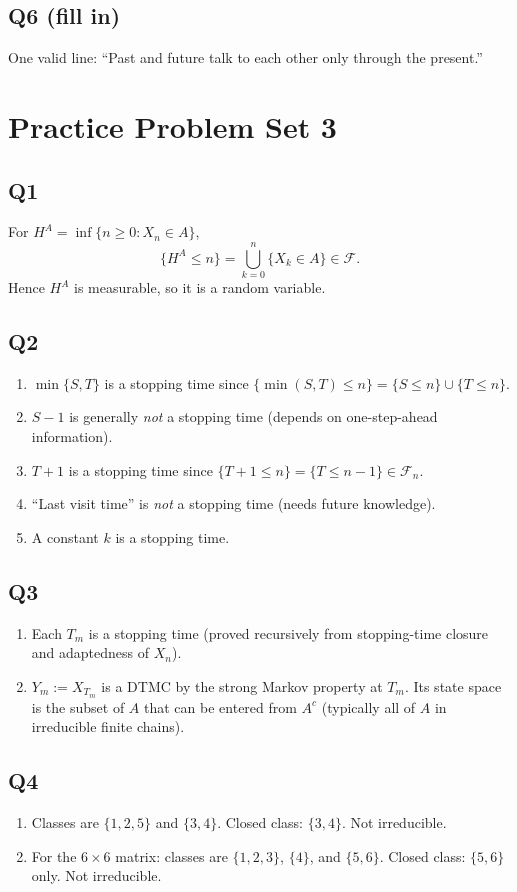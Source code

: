 \documentclass[11pt]{article}
\newcommand{\1}{\mathbf{1}}
\begin{document}
\subsection*{Q6 (fill in)}
One valid line: ``Past and future talk to each other only through the present.''

\section{Practice Problem Set 3}

\subsection*{Q1}
For $H^A=\inf\{n\ge0:X_n\in A\}$,
\[
\{H^A\le n\}=\bigcup_{k=0}^n\{X_k\in A\}\in\mathcal F.
\]
Hence $H^A$ is measurable, so it is a random variable.

\subsection*{Q2}
\begin{enumerate}[label=(\alph*)]
\item $\min\{S,T\}$ is a stopping time since $\{\min(S,T)\le n\}=\{S\le n\}\cup\{T\le n\}$.
\item $S-1$ is generally \emph{not} a stopping time (depends on one-step-ahead information).
\item $T+1$ is a stopping time since $\{T+1\le n\}=\{T\le n-1\}\in\mathcal F_n$.
\item ``Last visit time'' is \emph{not} a stopping time (needs future knowledge).
\item A constant $k$ is a stopping time.
\end{enumerate}

\subsection*{Q3}
\begin{enumerate}[label=(\alph*)]
\item Each $T_m$ is a stopping time (proved recursively from stopping-time closure and adaptedness of $X_n$).
\item $Y_m:=X_{T_m}$ is a DTMC by the strong Markov property at $T_m$. Its state space is the subset of $A$ that can be entered from $A^c$ (typically all of $A$ in irreducible finite chains).
\end{enumerate}

\subsection*{Q4}
\begin{enumerate}[label=(\alph*)]
\item Classes are $\{1,2,5\}$ and $\{3,4\}$. Closed class: $\{3,4\}$. Not irreducible.
\item For the $6\times6$ matrix: classes are $\{1,2,3\}$, $\{4\}$, and $\{5,6\}$. Closed class: $\{5,6\}$ only. Not irreducible.
\end{enumerate}
\end{document}
